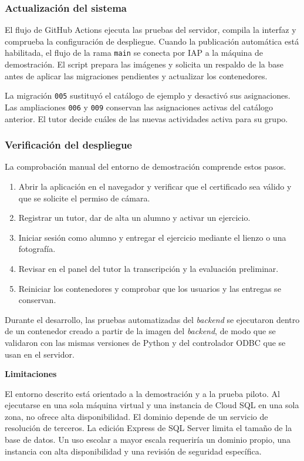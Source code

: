 \subsubsection{Actualización del sistema}

El flujo de GitHub Actions ejecuta las pruebas del servidor, compila la interfaz y comprueba la configuración de despliegue. Cuando la publicación automática está habilitada, el flujo de la rama \texttt{main} se conecta por IAP a la máquina de demostración. El script prepara las imágenes y solicita un respaldo de la base antes de aplicar las migraciones pendientes y actualizar los contenedores.

La migración \texttt{005} sustituyó el catálogo de ejemplo y desactivó sus asignaciones. Las ampliaciones \texttt{006} y \texttt{009} conservan las asignaciones activas del catálogo anterior. El tutor decide cuáles de las nuevas actividades activa para su grupo.

\subsubsection{Verificación del despliegue}

La comprobación manual del entorno de demostración comprende estos pasos.

\begin{enumerate}
    \item Abrir la aplicación en el navegador y verificar que el certificado sea válido y que se solicite el permiso de cámara.
    \item Registrar un tutor, dar de alta un alumno y activar un ejercicio.
    \item Iniciar sesión como alumno y entregar el ejercicio mediante el lienzo o una fotografía.
    \item Revisar en el panel del tutor la transcripción y la evaluación preliminar.
    \item Reiniciar los contenedores y comprobar que los usuarios y las entregas se conservan.
\end{enumerate}

Durante el desarrollo, las pruebas automatizadas del \textit{backend} se ejecutaron dentro de un contenedor creado a partir de la imagen del \textit{backend}, de modo que se validaron con las mismas versiones de Python y del controlador ODBC que se usan en el servidor.

\textbf{Limitaciones}

El entorno descrito está orientado a la demostración y a la prueba piloto. Al ejecutarse en una sola máquina virtual y una instancia de Cloud SQL en una sola zona, no ofrece alta disponibilidad. El dominio depende de un servicio de resolución de terceros. La edición Express de SQL Server limita el tamaño de la base de datos. Un uso escolar a mayor escala requeriría un dominio propio, una instancia con alta disponibilidad y una revisión de seguridad específica.
